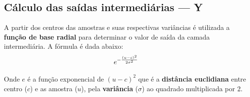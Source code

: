 \documentclass[10pt,twocolumn,letterpaper]{article}
\begin{document}
\subsection{Cálculo das saídas intermediárias --- Y}

A partir dos centros das amostras e suas respectivas variâncias é utilizada a \textbf{função de base radial} para determinar o valor de saída da camada intermediária. A fórmula é dada abaixo:
\begin{equation}
\large{e^{- \frac{(u - c)^2}{2\sigma^2}}}
\end{equation}

Onde \textbf{$e$} é a função exponencial de $(u-c)^2$ que é a \textbf{distância euclidiana} entre centro ($c$) e as amostra ($u$), pela \textbf{variância} ($\sigma$) ao quadrado multiplicada por 2.\\
\end{document}
